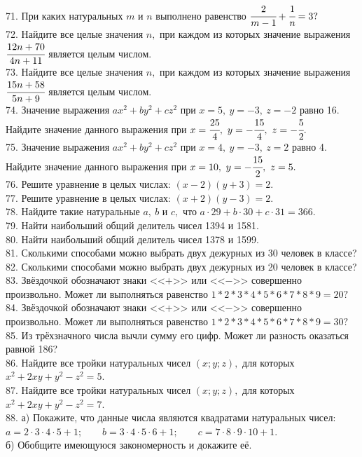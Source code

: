 \documentclass[12pt]{article}
\begin{document}
71. При каких натуральных $m$ и $n$ выполнено равенство $\cfrac{2}{m-1}+\cfrac{1}{n}=3?$\\
72. Найдите все целые значения $n,$ при каждом из которых значение выражения $\cfrac{12n+70}{4n+11}$ является целым числом.\\
73. Найдите все целые значения $n,$ при каждом из которых значение выражения $\cfrac{15n+58}{5n+9}$ является целым числом.\\
74. Значение выражения $ax^2+by^2+cz^2$ при $x=5,\ y=-3,\ z=-2$ равно 16. Найдите значение данного выражения при $x=\cfrac{25}{4},\ y=-\cfrac{15}{4},\ z=-\cfrac{5}{2}.$\\
75. Значение выражения $ax^2+by^2+cz^2$ при $x=4,\ y=-3,\ z=2$ равно 4. Найдите значение данного выражения при $x=10,\ y=-\cfrac{15}{2},\ z=5.$\\
76. Решите уравнение в целых числах: $(x-2)(y+3)=2.$\\
77. Решите уравнение в целых числах: $(x+2)(y-3)=2.$\\
78. Найдите такие натуральные $a,\ b$ и $c,$ что $a\cdot29+b\cdot30+c\cdot31=366.$\\
79. Найти наибольший общий делитель чисел 1394 и 1581.\\
80. Найти наибольший общий делитель чисел 1378 и 1599.\\
81. Сколькими способами можно выбрать двух дежурных из 30 человек в классе?\\
82. Сколькими способами можно выбрать двух дежурных из 20 человек в классе?\\
83. Звёздочкой обозначают знаки <<$+$>> или <<$-$>> совершенно произвольно. Может ли выполняться равенство $1*2*3*4*5*6*7*8*9=20?$\\
84. Звёздочкой обозначают знаки <<$+$>> или <<$-$>> совершенно произвольно. Может ли выполняться равенство $1*2*3*4*5*6*7*8*9=30?$\\
85. Из трёхзначного числа вычли сумму его цифр. Может ли разность оказаться равной 186?\\
86. Найдите все тройки натуральных чисел $(x;y;z),$ для которых $x^2+2xy+y^2-z^2=5.$\\
87. Найдите все тройки натуральных чисел $(x;y;z),$ для которых $x^2+2xy+y^2-z^2=7.$\\
88. а) Покажите, что данные числа являются квадратами натуральных чисел:\\
$a=2\cdot3\cdot4\cdot5+1;\qquad b=3\cdot4\cdot5\cdot6+1;\qquad c=7\cdot8\cdot9\cdot10+1.$\\
б) Обобщите имеющуюся закономерность и докажите её.\\
\end{document}
